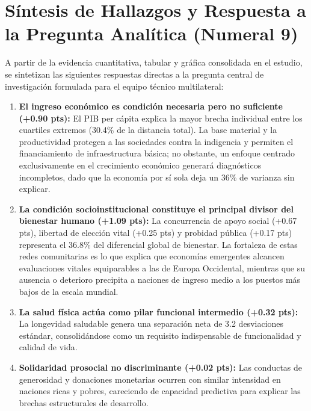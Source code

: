 \documentclass[11pt]{article}
\begin{document}
\section{Síntesis de Hallazgos y Respuesta a la Pregunta Analítica (Numeral 9)}

A partir de la evidencia cuantitativa, tabular y gráfica consolidada en el estudio, se sintetizan las siguientes respuestas directas a la pregunta central de investigación formulada para el equipo técnico multilateral:

\begin{enumerate}[leftmargin=1.5em, itemsep=0.35em]
    \item \textbf{El ingreso económico es condición necesaria pero no suficiente (+0.90 pts):} El PIB per cápita explica la mayor brecha individual entre los cuartiles extremos (30.4\% de la distancia total). La base material y la productividad protegen a las sociedades contra la indigencia y permiten el financiamiento de infraestructura básica; no obstante, un enfoque centrado exclusivamente en el crecimiento económico generará diagnósticos incompletos, dado que la economía por sí sola deja un 36\% de varianza sin explicar.
    \item \textbf{La condición socioinstitucional constituye el principal divisor del bienestar humano (+1.09 pts):} La concurrencia de apoyo social (+0.67 pts), libertad de elección vital (+0.25 pts) y probidad pública (+0.17 pts) representa el 36.8\% del diferencial global de bienestar. La fortaleza de estas redes comunitarias es lo que explica que economías emergentes alcancen evaluaciones vitales equiparables a las de Europa Occidental, mientras que su ausencia o deterioro precipita a naciones de ingreso medio a los puestos más bajos de la escala mundial.
    \item \textbf{La salud física actúa como pilar funcional intermedio (+0.32 pts):} La longevidad saludable genera una separación neta de 3.2 desviaciones estándar, consolidándose como un requisito indispensable de funcionalidad y calidad de vida.
    \item \textbf{Solidaridad prosocial no discriminante (+0.02 pts):} Las conductas de generosidad y donaciones monetarias ocurren con similar intensidad en naciones ricas y pobres, careciendo de capacidad predictiva para explicar las brechas estructurales de desarrollo.

\end{enumerate}
\end{document}
